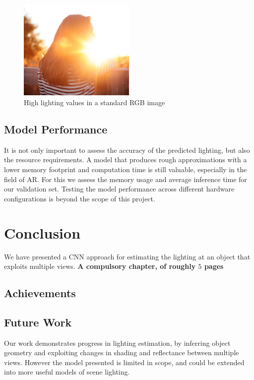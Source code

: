 \documentclass[ %
                    author={Gavin Parker},
                supervisor={Dr. Neill Campbell},
                    degree={MEng},
                     title={Deep Siamese Networks for Illumination Estimation from Stereo Images},
                  subtitle={},
                      type={research},
                      year={2018} ]{dissertation}
\begin{document}
\begin{figure}[h]
\centering
\includegraphics[width=0.5\textwidth]{exposure_example}
\caption{High lighting values in a standard RGB image}
\label{rgb_example}
\end{figure}

\section{Model Performance}
It is not only important to assess the accuracy of the predicted lighting, but also the resource requirements. A model that produces rough approximations with a lower memory footprint and computation time is still valuable, especially in the field of AR. For this we assess the memory usage and average inference time for our validation set. Testing the model performance across different hardware configurations is beyond the scope of this project.

\chapter{Conclusion}
\label{chap:conclusion}
We have presented a CNN approach for estimating the lighting at an object that exploits multiple views.
{\bf A compulsory chapter,     of roughly $5$ pages} 
\vspace{1cm} 

\noindent
\section{Achievements}
\section{Future Work}
Our work demonstrates progress in lighting estimation, by inferring object geometry and exploiting changes in shading and reflectance between multiple views. However the model presented is limited in scope, and could be extended into more useful models of scene lighting.
\end{document}
